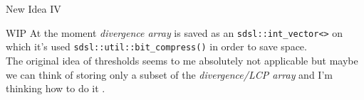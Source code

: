 \documentclass{beamer}
\begin{document}
\begin{frame}{New Idea IV}
  \begin{block}{WIP}
    At the moment \textit{divergence array} is saved as an
    \texttt{sdsl::int\_vector<>} on which it's used
    \texttt{sdsl::util::bit\_compress()} in order to save space.\\
    The original idea of thresholds seems to me absolutely not applicable but
    maybe we can think of storing only a subset of the \textit{divergence/LCP
      array} and I'm thinking how to do it .   
  \end{block}
\end{frame}
%   
%   
\end{document}
